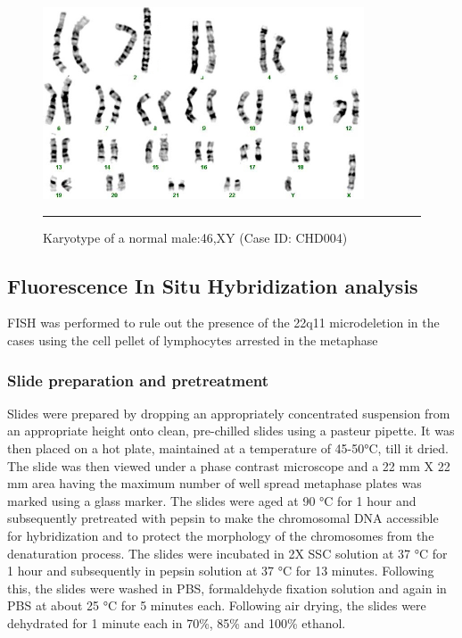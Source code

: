 \begin{figure}[!tb]
\centering
\includegraphics[width=\linewidth]{Figures/2_3nmlmale.pdf} 
\rule{35em}{0.5pt}
\caption{Karyotype of a normal male:46,XY (Case ID: CHD004)}
\label{fig:2_3nmlmale}
\end{figure}

\subsection{Fluorescence In Situ Hybridization analysis}
FISH was performed to rule out the presence of the 22q11 microdeletion in the cases using the cell pellet of lymphocytes arrested in the metaphase
\subsubsection{Slide preparation and pretreatment}
Slides were prepared by dropping an appropriately concentrated suspension from an appropriate height onto clean, pre-chilled slides using a pasteur pipette. It was then placed on a hot plate, maintained at a temperature of 45-50°C, till it dried. The slide was then viewed under a phase contrast microscope and a 22 mm X 22 mm area having the maximum number of well spread metaphase plates was marked using a glass marker. The slides were aged at 90 °C for 1 hour and subsequently pretreated with pepsin to make the chromosomal DNA accessible for hybridization and to protect the morphology of the chromosomes from the denaturation process. The slides were incubated in 2X SSC solution at 37 °C for 1 hour and subsequently in pepsin solution at 37 °C for 13 minutes. Following this, the slides were washed in PBS, formaldehyde fixation solution and again in PBS at about 25 °C for 5 minutes each. Following air drying, the slides were dehydrated for 1 minute each in 70\%, 85\% and 100\% ethanol.
